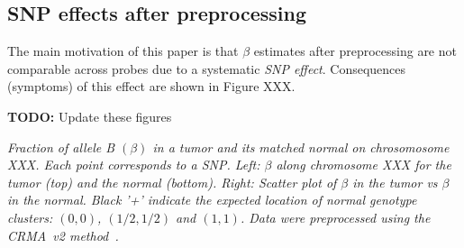 \documentclass[10pt]{bmc_article}
\newenvironment{bmcformat}{\fussy\setboolean{publ}{true}}{\fussy}
\newenvironment{TODO}{\color{red}\textbf{TODO:}}{}
\begin{document}
\begin{bmcformat}

\subsection*{SNP effects after preprocessing}
The main motivation of this paper is that $\beta$ estimates after preprocessing are not comparable across probes due to a systematic \emph{SNP effect}. Consequences (symptoms) of this effect are shown in Figure XXX. 

\begin{TODO}
Update these figures
\end{TODO}


\emph{Fraction of allele B $(\beta)$ in a tumor and its matched normal on chrosomosome XXX. Each point corresponds to a SNP. Left: $\beta$  along chromosome XXX for the tumor (top) and the normal (bottom). Right: Scatter plot of $\beta$ in the tumor vs $\beta$ in the normal. Black '+' indicate the expected location of normal genotype clusters: $(0,0)$, $(1/2,1/2)$ and $(1,1)$. Data were preprocessed using the CRMA~v2 method~\cite{BengtssonH_etal_2009b}.
}


\end{bmcformat}
\end{document}
